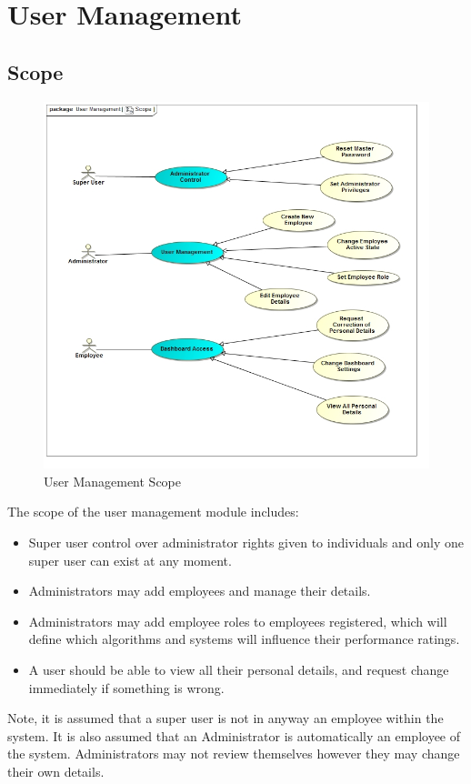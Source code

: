 \documentclass[11pt,a4paper]{article}
\begin{document}
\section{User Management}
\subsection{Scope}
\begin{figure}[H]
	\begin{center}
		\includegraphics[scale=0.6]{../Images/User_Management_Scope.jpg}
		\caption{User Management Scope}
	\end{center}
\end{figure}

\pagebreak

The scope of the user management module includes:
\begin{itemize}
	\item Super user control over administrator rights given to individuals and only one super user can exist at any moment.
	\item Administrators may add employees and manage their details.
	\item Administrators may add employee roles to employees registered, which will define which algorithms and systems will influence their performance ratings.
	\item A user should be able to view all their personal details, and request change immediately if something is wrong. 
\end{itemize}
Note, it is assumed that a super user is not in anyway an employee within the system. It is also assumed that an Administrator is automatically an employee of the system. Administrators may not review themselves however they may change their own details.
\end{document}
